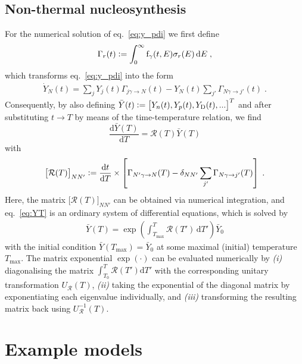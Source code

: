 \documentclass[11pt,a4paper]{article}
\newcommand{\fpdi}{\mathrm{f}}
\renewcommand{\d}{\text{d}}
\newcommand{\eqsp}{\;}
\newcommand{\ldefine}{\vcentcolon=}
\begin{document}
\subsection{Non-thermal nucleosynthesis}
For the numerical solution of eq.~\eqref{eq:y_pdi} we first define
\begin{align}
\Gamma_r(t) \ldefine \int_0^\infty \fpdi_\gamma(t, E) \sigma_r(E)\,\d E\eqsp,
\end{align}
which transforms eq.~\eqref{eq:y_pdi} into the form
\begin{align}
\dot{Y}_N(t) = \sum_{j} Y_{j}(t) \Gamma_{j\gamma \rightarrow N}(t) - Y_N(t) \sum_{j'} \Gamma_{N\gamma \rightarrow j'}(t)\eqsp.
\label{eq:y_pdi_redef}
\end{align}
Consequently, by also defining $\bar{Y}(t) \ldefine \big[ Y_n(t), Y_p(t), Y_\text{D}(t), ... \big]^T$ and after substituting $t \rightarrow T$ by means of the time-temperature relation, we find
\begin{equation}
\frac{\d \bar{Y}(T)}{\d T} = \mathcal{R}(T) \bar{Y}(T)
\label{eq:YT}
\end{equation}
with
\begin{align}
\big[ \mathcal{R}(T)\big]_{N N'} \ldefine \frac{\d t}{\d T} \times \left[ \Gamma_{N'\gamma\rightarrow N}(T)  - \delta_{N N'} \sum_{j'} \Gamma_{N\gamma\rightarrow j'}(T)\right]\eqsp.
\label{eq:rate_matrix}
\end{align}
Here, the matrix $\big[ \mathcal{R}(T)\big]_{N N'}$ can be obtained via numerical integration, and eq.~\eqref{eq:YT} is an ordinary system of differential equations, which is solved by
\begin{align}
\bar{Y}(T) = \exp\left(\int_{T_\text{max}}^T \mathcal{R}(T')\,\d T'\right)\bar{Y}_0
\end{align}
with the initial condition $\bar{Y}(T_\text{max}) = \bar{Y}_0$ at some maximal (initial) temperature $T_\text{max}$. The matrix exponential $\exp(\cdot)$ can be evaluated numerically by \emph{(i)} diagonalising the matrix $\int_{T_0}^T \mathcal{R}(T')\d T'$ with the corresponding unitary transformation $U_{\mathcal{R}}(T)$, \emph{(ii)} taking the exponential of the diagonal matrix by exponentiating each eigenvalue individually, and \emph{(iii)} transforming the resulting matrix back using $U_{\mathcal{R}}^{-1}(T)$.

\section{Example models}
\label{sec:example_models}
\end{document}
